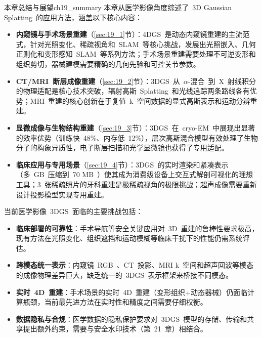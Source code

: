 \begin{futurebox}{本章总结与展望}{ch19_summary}
本章从医学影像角度综述了~3D Gaussian Splatting~的应用方法，涵盖以下核心内容：
\begin{itemize}
\item \textbf{内窥镜与手术场景重建}（\ref{sec:19_1}节）：4DGS~是动态内窥镜重建的主流范式，针对光照变化、稀疏视角和~SLAM~等核心挑战，发展出光照嵌入、几何正则化和变形感知~SLAM~等系列方法；手术场景重建需要处理不可逆变形和组织剪切，器械建模需要精确的几何先验和可控关节参数。
\item \textbf{CT/MRI~断层成像重建}（\ref{sec:19_2}节）：3DGS~从~$\alpha$-混合~到~X~射线积分的物理适配是核心技术突破，辐射高斯~Splatting~和光线追踪两条路线各有优势；MRI~重建的核心创新在于复值~k~空间数据的显式高斯表示和运动分辨重建。
\item \textbf{显微成像与生物结构重建}（\ref{sec:19_3}节）：3DGS~在~cryo-EM~中展现出显著的效率优势（训练快~48\%、内存低~12\%），层次高斯混合模型有效处理了生物分子的构象异质性，电子断层扫描和光学显微镜也获得了专用适配。
\item \textbf{临床应用与专用场景}（\ref{sec:19_4}节）：3DGS~的实时渲染和紧凑表示（多~GB~压缩到~70 MB~）使其成为消费级设备上交互式解剖可视化的理想工具；3~张稀疏照片的牙科重建是极稀疏视角的极限挑战；超声成像需要重新设计投影模型实现专用重建。
\end{itemize}

当前医学影像~3DGS~面临的主要挑战包括：
\begin{itemize}
\item \textbf{临床部署的可靠性}：手术导航等安全关键应用对~3D~重建的鲁棒性要求极高，现有方法在光照变化、组织遮挡和运动模糊等临床干扰下的性能仍需系统评估。
\item \textbf{跨模态统一表示}：内窥镜~RGB~、CT~投影、MRI k~空间和超声回波等模态的成像物理差异巨大，缺乏统一的~3DGS~表示框架来桥接不同模态。
\item \textbf{实时~4D~重建}：手术场景的实时~4D~重建（变形组织+动态器械）仍面临计算瓶颈，当前最先进方法在实时性和精度之间需要仔细权衡。
\item \textbf{数据隐私与合规}：医学数据的隐私保护要求对~3DGS~模型的存储、传输和共享提出额外约束，需要与安全水印技术（第~21~章）相结合。
\end{itemize}
\end{futurebox}
